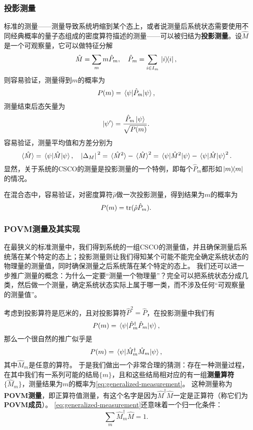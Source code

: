 \documentclass[UTF8, a4paper]{ctexart}
\begin{document}
\subsubsection{投影测量}

标准的测量——测量导致系统坍缩到某个态上，或者说测量后系统状态需要使用不同经典概率的量子态组成的密度算符描述的测量——可以被归结为\textbf{投影测量}。设$\hat{M}$是一个可观察量，它可以做特征分解
\begin{equation}
    \hat{M} = \sum_m m \hat{P}_m, \quad \hat{P}_m = \sum_{i \in I_m} \dyad*{i}{i},
\end{equation}
则容易验证，测量得到$m$的概率为
\begin{equation}
    P(m) = \mel*{\psi}{\hat{P}_m}{\psi},
\end{equation}
测量结束后态矢量为
\begin{equation}
    \ket{\psi'} = \frac{\hat{P}_m \ket{\psi}}{\sqrt{P(m)}}.
\end{equation}
容易验证，测量平均值和方差分别为
\begin{equation}
    \expval*{\hat{M}} = \mel*{\psi}{\hat{M}}{\psi}, \quad \abs*{\Delta_M}^2 = \expval*{\hat{M}^2} - \expval*{\hat{M}}^2 = \mel*{\psi}{\hat{M}^2}{\psi} - \mel*{\psi}{\hat{M}}{\psi}^2.
\end{equation}
显然，关于系统的CSCO的测量是投影测量的一个特例，即每个$\hat{P}_m$都形如$\dyad*{m}{m}$的情况。

在混合态中，容易验证，对密度算符$\hat{\rho}$做一次投影测量，得到结果为$m$的概率为
\begin{equation}
    P(m) = \trace(\hat{\rho} \hat{P}_m).
\end{equation}

\subsubsection{POVM测量及其实现}

在最狭义的标准测量中，我们得到系统的一组CSCO的测量值，并且确保测量后系统落在某个特定的态上；投影测量则让我们得知某个可能不能完全确定系统状态的物理量的测量值，同时确保测量之后系统落在某个特定的态上。
我们还可以进一步推广测量的概念：为什么一定要“测量一个物理量”？完全可以把系统状态分成几类，然后做一个测量，确定系统状态实际上属于哪一类，而不涉及任何“可观察量的测量值”。

考虑到投影算符是厄米的，且对投影算符$\hat{P}^2 = \hat{P}$，在投影测量中我们有
\[
    P(m) = \mel*{\psi}{\hat{P}_m^\dagger \hat{P}_m}{\psi},
\]
那么一个很自然的推广似乎是
\begin{equation}
    P(m) = \mel*{\psi}{\hat{M}_m^\dagger \hat{M}_m}{\psi},
    \label{eq:generalized-measurement}
\end{equation}
其中$\hat{M}_m$是任意的算符。
于是我们做出一个非常合理的猜测：存在一种测量过程，在其中我们有一系列可能的结局$\{m\}$，且和这些结局相对应的有一组\textbf{测量算符}$\{\hat{M}_m\}$，测量结果为$m$的概率为\eqref{eq:generalized-measurement}。
这种测量称为\textbf{POVM测量}，即正算符值测量，有这个名字是因为$\hat{M}^\dagger \hat{M}$一定是正算符（称它们为\textbf{POVM成员}）。
\eqref{eq:generalized-measurement}还意味着一个归一化条件：
\begin{equation}
    \sum_m \hat{M}^\dagger_m \hat{M} = 1.
\end{equation}
\end{document}
